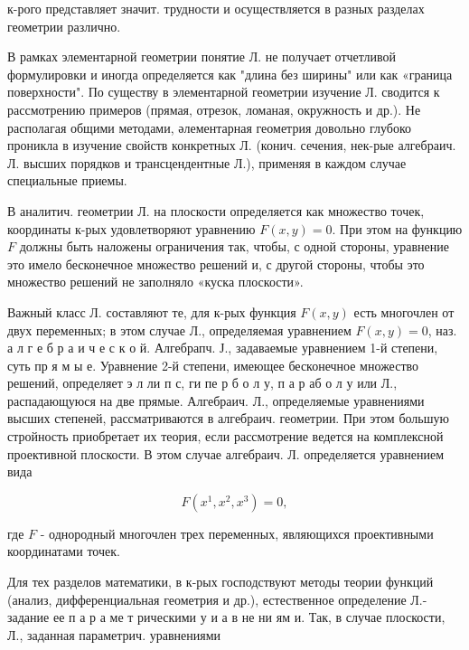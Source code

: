 \documentclass[10pt]{article}
\begin{document}
к-рого представляет значит. трудности и осуществляется в разных разделах геометрии различно.



В рамках элементарной геометрии понятие Л. не получает отчетливой формулировки и иногда определяется как "длина без ширины" или как «граница поверхности". По существу в элементарной геометрии изучение Л. сводится к рассмотрению примеров (прямая, отрезок, ломаная, окружность и др.). Не располагая общими методами, әлементарная геометрия довольно глубоко проникла в изучение свойств конкретных Л. (конич. сечения, нек-рые алгебраич. Л. высших порядков и трансцендентные Л.), применяя в каждом случае специальные приемы.



В аналитич. геометрии Л. на плоскости определяется как множество точек, координаты к-рых удовлетворяют уравнению $F(x, y)=0$. При этом на функцию $F$ должны быть наложены ограничения так, чтобы, с одной стороны, уравнение это имело бесконечное множество решений и, с другой стороны, чтобы это множество решений не заполняло «куска плоскости».



Важный класс Л. составляют те, для к-рых функция $F(x, y)$ есть многочлен от двух переменных; в этом случае Л., определяемая уравнением $F(x, y)=0$, наз. а л г е б р а и ч е с к о й. Алгебрапч. Ј., задаваемые уравнением 1-й степени, суть пр я м ы е. Уравнение 2-й степени, имеющее бесконечное множество решений, определяет э л ли п с, ги пе р б о л у, п а р аб о л у или Л., распадающуюся на две прямые. Алгебраич. Л., определяемые уравнениями высших степеней, рассматриваются в алгебраич. геометрии. При этом большую стройность приобретает их теория, если рассмотрение ведется на комплексной проективной плоскости. В этом случае алгебраич. Л. определяется уравнением вида



\[

F\left(x^{1}, x^{2}, x^{3}\right)=0,

\]



где $F$ - однородный многочлен трех переменных, являющихся проективными координатами точек.



Для тех разделов математики, в к-рых господствуют методы теории функций (анализ, дифференциальная геометрия и др.), естественное определение Л.- задание ее п а р а ме т рическими у и а в не ни ям и. Так, в случае плоскости, Л., заданная параметрич. уравнениями
\end{document}
